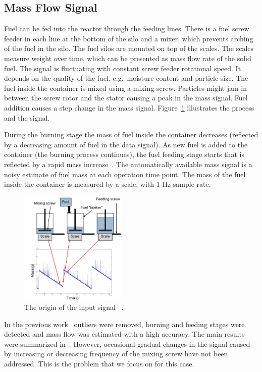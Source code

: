 \subsection{Mass Flow Signal}

Fuel can be fed into the reactor through the feeding lines. There is a fuel screw feeder in each line at the bottom of the silo and a mixer, which prevents arching of the fuel in the silo.
The fuel silos are mounted on top of the scales. The scales measure weight over time, which can be presented as mass flow rate of the solid fuel.
The signal is fluctuating with constant screw feeder rotational speed. It depends on the quality of the fuel, e.g.\ moisture content and particle size.
The fuel inside the container is mixed using a mixing screw. Particles might jam in between the screw rotor and the stator causing a peak in the mass signal.
Fuel addition causes a step change in the mass signal. Figure~\ref{fig:OMF} illustrates the process and the signal.

During the burning stage the mass of fuel inside the container decreases (reflected by a decreasing amount of fuel in the data signal). As new fuel is added to the container (the burning process continues),
the fuel feeding stage starts that is reflected by a rapid mass increase~\cite{ZliobaiteBP09}.
The automatically available mass signal is a noisy estimate of fuel mass at each operation time point. The mass of the fuel inside the container is measured by a scale, with 1 Hz sample rate.

\begin{figure}[htb!]
\includegraphics[width=0.45\textwidth]{pics/cfb_paper/OMF/MassFlowScheme}
\caption{The origin of the input signal ~\cite{ZliobaiteBP09}.}\label{fig:OMF}
\end{figure}

In the previous work~\cite{ZliobaiteBP09,BakkerSensorsKDD09,DBLP:conf/incdm/IvannikovPBLJKA09} outliers were removed,
burning and feeding stages were detected and mass flow was estimated with a high accuracy. The main results were summarized in~\cite{PechenizkiySIGKDDExpl09}.
However, occasional gradual changes in the signal caused by increasing or decreasing frequency of the mixing screw have not been addressed.
This is the problem that we focus on for this case.

